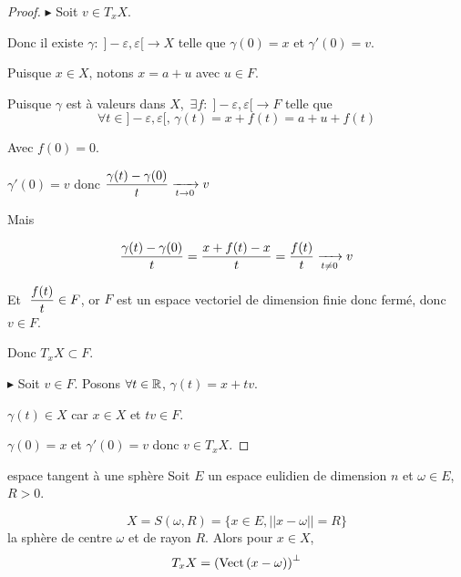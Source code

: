 \begin{proof}
    $\blacktriangleright$ Soit $v \in T_xX$. 

    Donc il existe $\gamma : \; ]- \varepsilon, \varepsilon[ \to X$ telle que 
    $\gamma(0) = x$ et $\gamma'(0) = v$.

    Puisque $x \in X$, notons $x = a + u$ avec $u \in F$.

    Puisque $\gamma$ est à valeurs dans $X$, $\, \exists f : \; ]-\varepsilon, \varepsilon[ \to F$ telle 
    que 
    $$\forall t \in ]- \varepsilon, \varepsilon[, \, \gamma(t) = x + f(t) = a + u + f(t)$$ 
    
    Avec $f(0) = 0$.

    $\gamma'(0) = v$ donc $\displaystyle \frac{\gamma(t) - \gamma(0)}{t} \xrightarrow[t \to 0 ]{} v$
    
    Mais

    $$\displaystyle \frac{\gamma(t) - \gamma(0)}{t } = \frac{x + f(t) - x} t = \frac{f(t)}{t} \xrightarrow[t \neq 0 ]{} v$$

    Et $\; \displaystyle \frac{f(t)}{t} \in F$, or $F$ est un espace vectoriel de dimension finie donc fermé, 
    donc $v \in F$.

    Donc $T_xX \subset F$.

    \lvspace 

    $\blacktriangleright$ Soit $v \in F$. Posons $\forall t \in \mathbb{R}$, $\gamma(t) = x + t v$.

    $\gamma(t) \in X$ car $x \in X$ et $tv \in F$. 

    $\gamma(0) = x $ et $\gamma'(0) = v$ donc $v \in T_xX$.
\end{proof} 

\begin{proposition}{espace tangent à une sphère}{}
    Soit $E$ un espace eulidien de dimension $n$ et $\omega \in E$, $R > 0$. 

    $$X = S(\omega, R) = \{x \in E, ||x - \omega|| = R\}$$ la sphère de centre $\omega$ et de rayon $R$.
    Alors pour $x \in X$, 
    $$T_xX = \left( \operatorname{Vect} \,(x - \omega) \right)^\perp$$
\end{proposition}


